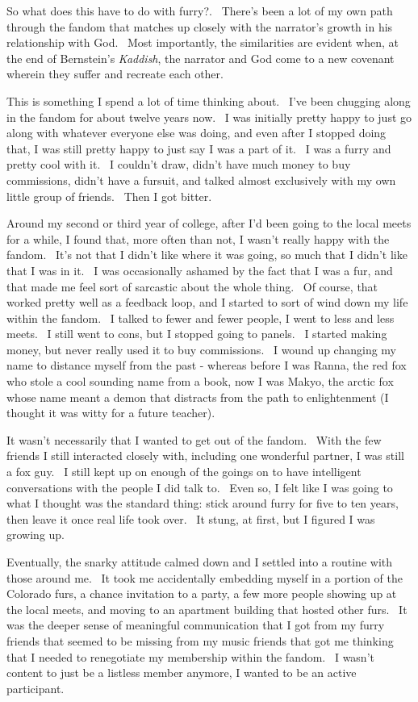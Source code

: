 So what does this have to do with furry?. ~There's been a lot of my own
path through the fandom that matches up closely with the narrator's
growth in his relationship with God. ~Most importantly, the similarities
are evident when, at the end of Bernstein's \emph{Kaddish}, the narrator
and God come to a new covenant wherein they suffer and recreate each
other.

This is something I spend a lot of time thinking about. ~I've been
chugging along in the fandom for about twelve years now. ~I was
initially pretty happy to just go along with whatever everyone else was
doing, and even after I stopped doing that, I was still pretty happy to
just say I was a part of it. ~I was a furry and pretty cool with it. ~I
couldn't draw, didn't have much money to buy commissions, didn't have a
fursuit, and talked almost exclusively with my own little group of
friends. ~Then I got bitter.

Around my second or third year of college, after I'd been going to the
local meets for a while, I found that, more often than not, I wasn't
really happy with the fandom. ~It's not that I didn't like where it was
going, so much that I didn't like that I was in it. ~I was occasionally
ashamed by the fact that I was a fur, and that made me feel sort of
sarcastic about the whole thing. ~Of course, that worked pretty well as
a feedback loop, and I started to sort of wind down my life within the
fandom. ~I talked to fewer and fewer people, I went to less and less
meets. ~I still went to cons, but I stopped going to panels. ~I started
making money, but never really used it to buy commissions. ~I wound up
changing my name to distance myself from the past - whereas before I was
Ranna, the red fox who stole a cool sounding name from a book, now I was
Makyo, the arctic fox whose name meant a demon that distracts from the
path to enlightenment (I thought it was witty for a future teacher).

It wasn't necessarily that I wanted to get out of the fandom. ~With the
few friends I still interacted closely with, including one wonderful
partner, I was still a fox guy. ~I still kept up on enough of the goings
on to have intelligent conversations with the people I did talk to.
~Even so, I felt like I was going to what I thought was the standard
thing: stick around furry for five to ten years, then leave it once real
life took over. ~It stung, at first, but I figured I was growing up.

Eventually, the snarky attitude calmed down and I settled into a routine
with those around me. ~It took me accidentally embedding myself in a
portion of the Colorado furs, a chance invitation to a party, a few more
people showing up at the local meets, and moving to an apartment
building that hosted other furs. ~It was the deeper sense of meaningful
communication that I got from my furry friends that seemed to be missing
from my music friends that got me thinking that I needed to renegotiate
my membership within the fandom. ~I wasn't content to just be a listless
member anymore, I wanted to be an active participant.

